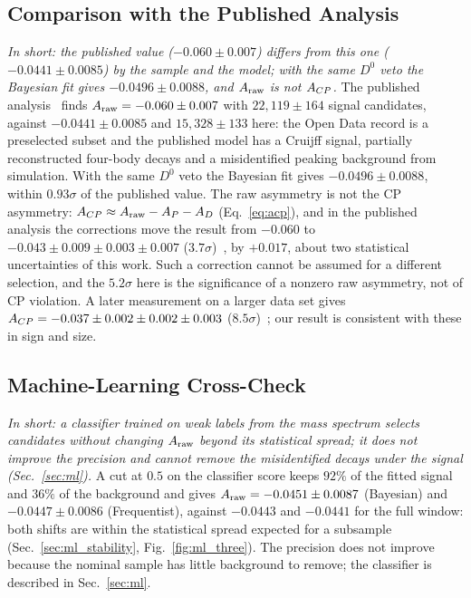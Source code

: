 \subsection{Comparison with the Published Analysis}
\label{sec:comparison_published}
\emph{In short: the published value ($-0.060\pm0.007$) differs from this one ($-0.0441\pm0.0085$) by the sample and the model; with the same $D^0$ veto the Bayesian fit gives $-0.0496\pm0.0088$, and $A_{\mathrm{raw}}$ is not $A_{CP}$.}
The published analysis~\cite{lhcb_cpv_2013} finds $A_{\mathrm{raw}}=-0.060\pm0.007$ with $22{,}119\pm164$ signal candidates, against $-0.0441\pm0.0085$ and $15{,}328\pm133$ here: the Open Data record is a preselected subset and the published model has a Cruijff signal, partially reconstructed four-body decays and a misidentified peaking background from simulation. With the same $D^0$ veto the Bayesian fit gives $-0.0496\pm0.0088$, within $0.93\sigma$ of the published value.
The raw asymmetry is not the CP asymmetry: $A_{CP}\approx A_{\mathrm{raw}}-A_P-A_D$ (Eq.~\eqref{eq:acp}), and in the published analysis the corrections move the result from $-0.060$ to $-0.043\pm0.009\pm0.003\pm0.007$ ($3.7\sigma$)~\cite{lhcb_cpv_2013}, by $+0.017$, about two statistical uncertainties of this work. Such a correction cannot be assumed for a different selection, and the $5.2\sigma$ here is the significance of a nonzero raw asymmetry, not of CP violation. A later measurement on a larger data set gives $A_{CP}=-0.037\pm0.002\pm0.002\pm0.003$ ($8.5\sigma$)~\cite{lhcb_cpv_prd2023,lhcb_cpv_paper}; our result is consistent with these in sign and size.
\subsection{Machine-Learning Cross-Check}
\label{sec:comparison_mlcheck}
\emph{In short: a classifier trained on weak labels from the mass spectrum selects candidates without changing $A_{\mathrm{raw}}$ beyond its statistical spread; it does not improve the precision and cannot remove the misidentified decays under the signal (Sec.~\ref{sec:ml}).}
A cut at $0.5$ on the classifier score keeps $92\%$ of the fitted signal and $36\%$ of the background and gives $A_{\mathrm{raw}}=-0.0451\pm0.0087$ (Bayesian) and $-0.0447\pm0.0086$ (Frequentist), against $-0.0443$ and $-0.0441$ for the full window: both shifts are within the statistical spread expected for a subsample (Sec.~\ref{sec:ml_stability}, Fig.~\ref{fig:ml_three}). The precision does not improve because the nominal sample has little background to remove; the classifier is described in Sec.~\ref{sec:ml}.
